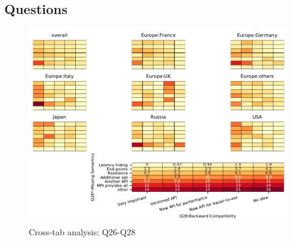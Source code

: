 
\subsection{Questions}


\begin{figure}
\begin{center}
\includegraphics[width=12cm]{../pdfs/Q26-Q28.pdf}
\caption{Cross-tab analysis: Q26-Q28}
\label{fig:Q26-Q28}
\end{center}
\end{figure}
